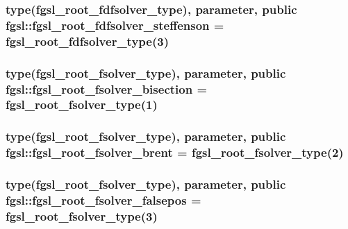 \subsubsection[{fgsl\+\_\+root\+\_\+fdfsolver\+\_\+steffenson}]{\setlength{\rightskip}{0pt plus 5cm}type({\bf fgsl\+\_\+root\+\_\+fdfsolver\+\_\+type}), parameter, public fgsl\+::fgsl\+\_\+root\+\_\+fdfsolver\+\_\+steffenson = {\bf fgsl\+\_\+root\+\_\+fdfsolver\+\_\+type}(3)}\label{namespacefgsl_aca4a5d84619cc9678ec442a1f33741aa}
\hypertarget{namespacefgsl_aa7dc27fd2c5eda5bdd57f4936c041faf}{}
\subsubsection[{fgsl\+\_\+root\+\_\+fsolver\+\_\+bisection}]{\setlength{\rightskip}{0pt plus 5cm}type({\bf fgsl\+\_\+root\+\_\+fsolver\+\_\+type}), parameter, public fgsl\+::fgsl\+\_\+root\+\_\+fsolver\+\_\+bisection = {\bf fgsl\+\_\+root\+\_\+fsolver\+\_\+type}(1)}\label{namespacefgsl_aa7dc27fd2c5eda5bdd57f4936c041faf}
\hypertarget{namespacefgsl_a097401e95907837ed18233ae594898d2}{}
\subsubsection[{fgsl\+\_\+root\+\_\+fsolver\+\_\+brent}]{\setlength{\rightskip}{0pt plus 5cm}type({\bf fgsl\+\_\+root\+\_\+fsolver\+\_\+type}), parameter, public fgsl\+::fgsl\+\_\+root\+\_\+fsolver\+\_\+brent = {\bf fgsl\+\_\+root\+\_\+fsolver\+\_\+type}(2)}\label{namespacefgsl_a097401e95907837ed18233ae594898d2}
\hypertarget{namespacefgsl_ac71356c84267ed5e1dba5501be28b428}{}
\subsubsection[{fgsl\+\_\+root\+\_\+fsolver\+\_\+falsepos}]{\setlength{\rightskip}{0pt plus 5cm}type({\bf fgsl\+\_\+root\+\_\+fsolver\+\_\+type}), parameter, public fgsl\+::fgsl\+\_\+root\+\_\+fsolver\+\_\+falsepos = {\bf fgsl\+\_\+root\+\_\+fsolver\+\_\+type}(3)}\label{namespacefgsl_ac71356c84267ed5e1dba5501be28b428}
\hypertarget{namespacefgsl_a8a929fa82ff6c96e5022ee2346fb2732}{}

